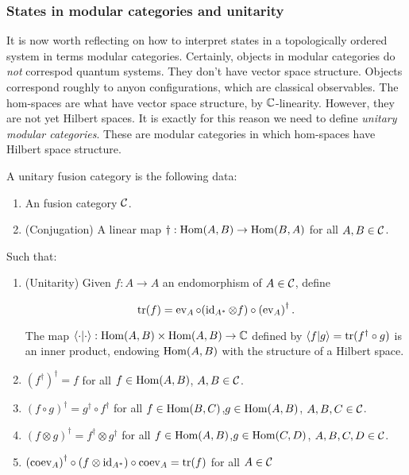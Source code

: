 \subsubsection{States in modular categories and unitarity}

It is now worth reflecting on how to interpret states in a topologically ordered system in terms modular categories. Certainly, objects in modular categories do {\em not} correspod quantum systems. They don't have vector space structure. Objects correspond roughly to anyon configurations, which are classical observables. The hom-spaces are what have vector space structure, by ${\mathbb C}$-linearity. However, they are not yet Hilbert spaces. It is exactly for this reason we need to define {\em unitary modular categories}. These are modular categories in which hom-spaces have Hilbert space structure.

\begin{defn} A unitary fusion category is the following data:

\begin{enumerate}
\item An fusion category ${\mathcal C}$.
\item (Conjugation) A linear map $\dagger: \operatorname{Hom}(A,B)\to \operatorname{Hom}(B,A)$ for all $A,B\in {\mathcal C}$.
\end{enumerate}

Such that:

\begin{enumerate}
\item (Unitarity) Given $f:A\to A$ an endomorphism of $A\in {\mathcal C}$, define


$$\operatorname{tr}(f)=\operatorname{ev}_A \circ (\operatorname{id}_{A^*}\otimes f)\circ \left(\operatorname{ev}_A\right)^{\dagger}.$$

The map $\left<\cdot|\cdot\right>:\operatorname{Hom}(A,B)\times \operatorname{Hom}(A,B)\to {\mathbb C}$ defined by $\left<f|g\right>=\operatorname{tr}(f^{\dagger}\circ g)$ is an inner product, endowing $\operatorname{Hom}(A,B)$ with the structure of a Hilbert space.
\item $\left(f^{\dagger}\right)^{\dagger}=f$ for all $f\in \operatorname{Hom}(A,B)$, $A,B\in {\mathcal C}$.

\item $(f\circ g)^{\dagger}=g^{\dagger}\circ f^{\dagger}$ for all $f\in \operatorname{Hom}(B,C)$,$g\in \operatorname{Hom}(A,B)$, $A,B,C\in {\mathcal C}$.

\item $(f\otimes g)^{\dagger}=f^{\dagger}\otimes g^{\dagger}$ for all $f\in \operatorname{Hom}(A,B)$,$g\in \operatorname{Hom}(C,D)$, $A,B,C,D\in {\mathcal C}$.
\item $\left(\operatorname{coev}_A\right)^{\dagger}\circ (f \otimes \operatorname{id}_{A^*})\circ \operatorname{coev}_A=\operatorname{tr}(f)$ for all $A\in {\mathcal C}$
\end{enumerate}
\end{defn}

